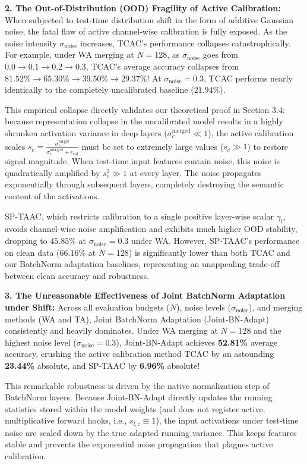 \documentclass{article}
\begin{document}
\textbf{2. The Out-of-Distribution (OOD) Fragility of Active Calibration:}
When subjected to test-time distribution shift in the form of additive Gaussian noise, the fatal flaw of active channel-wise calibration is fully exposed. As the noise intensity $\sigma_{\mathrm{noise}}$ increases, TCAC's performance collapses catastrophically. For example, under WA merging at $N = 128$, as $\sigma_{\mathrm{noise}}$ goes from $0.0 \to 0.1 \to 0.2 \to 0.3$, TCAC's average accuracy collapses from $81.52\% \to 65.30\% \to 39.50\% \to \mathbf{29.37\%}$! At $\sigma_{\mathrm{noise}} = 0.3$, TCAC performs nearly identically to the completely uncalibrated baseline ($21.94\%$). 

This empirical collapse directly validates our theoretical proof in Section 3.4: because representation collapse in the uncalibrated model results in a highly shrunken activation variance in deep layers ($\sigma^{\mathrm{merged}}_c \ll 1$), the active calibration scales $s_c = \frac{\sigma^{\mathrm{target}}_c}{\sigma^{\mathrm{merged}}_c + \epsilon_{\mathrm{cal}}}$ must be set to extremely large values ($s_c \gg 1$) to restore signal magnitude. When test-time input features contain noise, this noise is quadratically amplified by $s_c^2 \gg 1$ at every layer. The noise propagates exponentially through subsequent layers, completely destroying the semantic content of the activations.

SP-TAAC, which restricts calibration to a single positive layer-wise scalar $\gamma_l$, avoids channel-wise noise amplification and exhibits much higher OOD stability, dropping to $45.85\%$ at $\sigma_{\mathrm{noise}} = 0.3$ under WA. However, SP-TAAC's performance on clean data ($66.16\%$ at $N = 128$) is significantly lower than both TCAC and our BatchNorm adaptation baselines, representing an unappealing trade-off between clean accuracy and robustness.

\textbf{3. The Unreasonable Effectiveness of Joint BatchNorm Adaptation under Shift:}
Across all evaluation budgets ($N$), noise levels ($\sigma_{\mathrm{noise}}$), and merging methods (WA and TA), Joint BatchNorm Adaptation (Joint-BN-Adapt) consistently and heavily dominates. Under WA merging at $N = 128$ and the highest noise level ($\sigma_{\mathrm{noise}} = 0.3$), Joint-BN-Adapt achieves \textbf{52.81\%} average accuracy, crushing the active calibration method TCAC by an astounding \textbf{23.44\%} absolute, and SP-TAAC by \textbf{6.96\%} absolute! 

This remarkable robustness is driven by the native normalization step of BatchNorm layers. Because Joint-BN-Adapt directly updates the running statistics stored within the model weights (and does not register active, multiplicative forward hooks, i.e., $s_{l,c} \equiv 1$), the input activations under test-time noise are scaled down by the true adapted running variance. This keeps features stable and prevents the exponential noise propagation that plagues active calibration.
\end{document}
